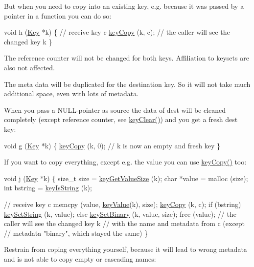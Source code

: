 But when you need to copy into an existing key, e.\-g. because it was passed by a pointer in a function you can do so\-:


\begin{DoxyCodeInclude}
\textcolor{keywordtype}{void} h (\hyperlink{classkdb_1_1Key_a5679f5cae63caddd64a60388b9cc77fa}{Key} *k)
\{
        \textcolor{comment}{// receive key c}
        \hyperlink{group__key_ga6a12cbbe656a1ad9f41b8c681d7a2f92}{keyCopy} (k, c);
        \textcolor{comment}{// the caller will see the changed key k}
\}
\end{DoxyCodeInclude}
 The reference counter will not be changed for both keys. Affiliation to keysets are also not affected.

The meta data will be duplicated for the destination key. So it will not take much additional space, even with lots of metadata.

When you pass a N\-U\-L\-L-\/pointer as source the data of dest will be cleaned completely (except reference counter, see \hyperlink{group__key_gab2242311a36bbc0520e0d36895107ec1}{key\-Clear()}) and you get a fresh dest key\-:


\begin{DoxyCodeInclude}
\textcolor{keywordtype}{void} g (\hyperlink{classkdb_1_1Key_a5679f5cae63caddd64a60388b9cc77fa}{Key} *k)
\{
        \hyperlink{group__key_ga6a12cbbe656a1ad9f41b8c681d7a2f92}{keyCopy} (k, 0);
        \textcolor{comment}{// k is now an empty and fresh key}
\}
\end{DoxyCodeInclude}
 If you want to copy everything, except e.\-g. the value you can use \hyperlink{group__key_ga6a12cbbe656a1ad9f41b8c681d7a2f92}{key\-Copy()} too\-:


\begin{DoxyCodeInclude}
\textcolor{keywordtype}{void} j (\hyperlink{classkdb_1_1Key_a5679f5cae63caddd64a60388b9cc77fa}{Key} *k)
\{
        \textcolor{keywordtype}{size\_t} size = \hyperlink{group__keyvalue_gae326672fffb7474abfe9baf53b73217e}{keyGetValueSize} (k);
        \textcolor{keywordtype}{char} *value = malloc (size);
        \textcolor{keywordtype}{int} bstring = \hyperlink{group__keytest_gaea7670778abd07fee0fe8ac12a149190}{keyIsString} (k);

        \textcolor{comment}{// receive key c}
        memcpy (value, \hyperlink{group__keyvalue_ga6f29609c5da53c6dc26a98678d5752af}{keyValue}(k), size);
        \hyperlink{group__key_ga6a12cbbe656a1ad9f41b8c681d7a2f92}{keyCopy} (k, c);
        \textcolor{keywordflow}{if} (bstring) \hyperlink{group__keyvalue_ga622bde1eb0e0c4994728331326340ef2}{keySetString} (k, value);
        \textcolor{keywordflow}{else} \hyperlink{group__keyvalue_gaa50a5358fd328d373a45f395fa1b99e7}{keySetBinary} (k, value, size);
        free (value);
        \textcolor{comment}{// the caller will see the changed key k}
        \textcolor{comment}{// with the name and metadata from c (except}
        \textcolor{comment}{// metadata "binary", which stayed the same)}
\}
\end{DoxyCodeInclude}
 Restrain from coping everything yourself, because it will lead to wrong metadata and is not able to copy empty or cascading names\-:


